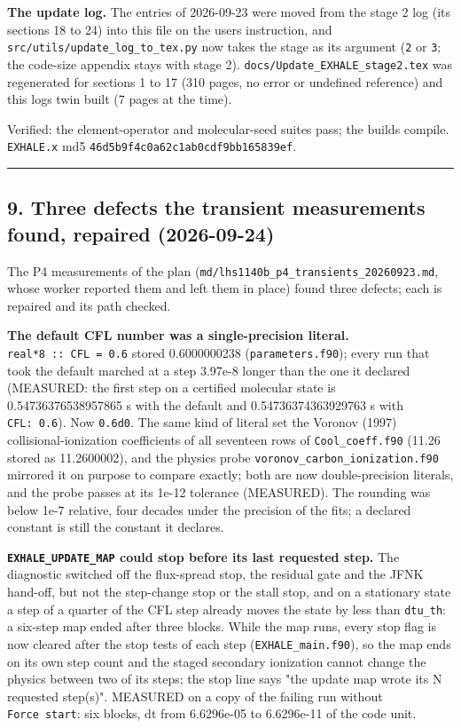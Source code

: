 \documentclass[english,a4paper]{my_memo}
\begin{document}
\textbf{The update log.} The entries of 2026-09-23 were moved from the stage 2 log
(its sections 18 to 24) into this file on the user\textquotesingle s instruction, and
\texttt{src/utils/update\_log\_to\_tex.py} now takes the stage as its argument (\texttt{2} or
\texttt{3}; the code-size appendix stays with stage 2). \texttt{docs/Update\_EXHALE\_stage2.tex}
was regenerated for sections 1 to 17 (310 pages, no error or undefined
reference) and this log\textquotesingle s twin built (7 pages at the time).

Verified: the element-operator and molecular-seed suites pass; the builds
compile. \texttt{EXHALE.x} md5 \texttt{46d5b9f4c0a62c1ab0cdf9bb165839ef}.

\begin{center}\rule{0.5\linewidth}{0.5pt}\end{center}

\subsection{9. Three defects the transient measurements found, repaired (2026-09-24)}\label{9-three-defects-the-transient-measurements-found-repaired-2026-09-24}

The P4 measurements of the plan (\texttt{md/lhs1140b\_p4\_transients\_20260923.md},
whose worker reported them and left them in place) found three defects; each
is repaired and its path checked.

\textbf{The default CFL number was a single-precision literal.} \texttt{real*8\ ::\ CFL\ =\ 0.6} stored 0.6000000238 (\texttt{parameters.f90}); every run that took the default
marched at a step 3.97e-8 longer than the one it declared (MEASURED: the first
step on a certified molecular state is 0.54736376538957865 s with the default
and 0.54736374363929763 s with \texttt{CFL:\ 0.6}). Now \texttt{0.6d0}. The same kind of
literal set the Voronov (1997) collisional-ionization coefficients of all
seventeen rows of \texttt{Cool\_coeff.f90} (11.26 stored as 11.2600002), and the
physics probe \texttt{voronov\_carbon\_ionization.f90} mirrored it on purpose to
compare exactly; both are now double-precision literals, and the probe passes
at its 1e-12 tolerance (MEASURED). The rounding was below 1e-7 relative, four
decades under the precision of the fits; a declared constant is still the
constant it declares.

\textbf{\texttt{EXHALE\_UPDATE\_MAP} could stop before its last requested step.} The
diagnostic switched off the flux-spread stop, the residual gate and the JFNK
hand-off, but not the step-change stop or the stall stop, and on a stationary
state a step of a quarter of the CFL step already moves the state by less
than \texttt{dtu\_th}: a six-step map ended after three blocks. While the map runs,
every stop flag is now cleared after the stop tests of each step
(\texttt{EXHALE\_main.f90}), so the map ends on its own step count and the staged
secondary ionization cannot change the physics between two of its steps; the
stop line says "the update map wrote its N requested step(s)". MEASURED on a
copy of the failing run without \texttt{Force\ start}: six blocks, dt from 6.6296e-05
to 6.6296e-11 of the code unit.
\end{document}
